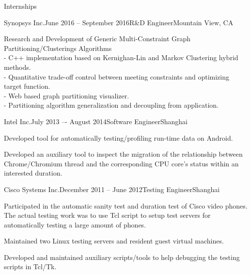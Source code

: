 \documentclass{resume} %
\begin{document}

\begin{rSection}{Internships}

    \begin{rSubsection}{Synopsys Inc.}{June 2016 -- September 2016}{R\&D Engineer}{Mountain View, CA}

    \item Research and Development of Generic Multi-Constraint Graph Partitioning/Clusterings Algorithms
     \\- C++ implementation based on Kernighan-Lin and Markov Clustering hybrid methods.
     \\- Quantitative trade-off control between meeting constraints and optimizing target function.
     \\- Web based graph partitioning visualizer.
     \\- Partitioning algorithm generalization and decoupling from application.
    \end{rSubsection}

    \begin{rSubsection}{Intel Inc.}{July 2013 –- August 2014}{Software Engineer}{Shanghai}

    \item Developed tool for automatically testing/profiling run-time data on Android.

    \item Developed an auxiliary tool to inspect the migration of the
        relationship between Chrome/Chromium thread and the corresponding CPU
        core's status within an interested duration.

    \end{rSubsection}

    \begin{rSubsection}{Cisco Systems Inc.}{December 2011 -- June 2012}{Testing Engineer}{Shanghai}

    \item Participated in the automatic sanity test and duration test of Cisco
        video phones. The actual testing work was to use Tcl script to
        setup test servers for automatically testing a large amount of phones.

    \item Maintained two Linux testing servers and resident guest virtual
        machines.

    \item Developed and maintained auxiliary scripts/tools to help debugging
        the testing scripts in Tcl/Tk.

    \end{rSubsection}

\end{rSection}
\end{document}
